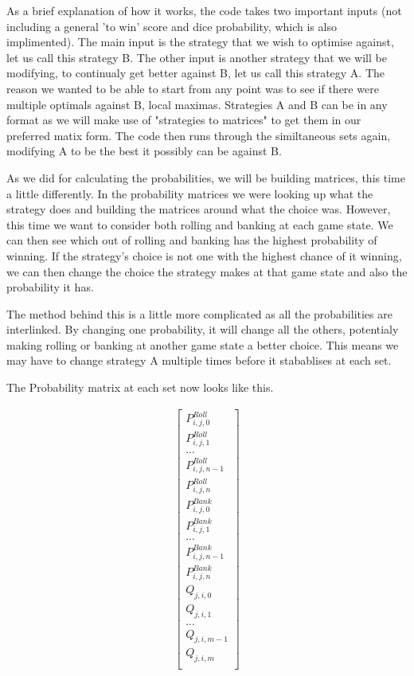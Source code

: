 \documentclass[a4paper,titlepage]{article}
\begin{document}
As a brief explanation of how it works, the code takes two important inputs (not including a general 'to win' score and dice probability, which is also implimented). The main input is the strategy that we wish to optimise against, let us call this strategy B. The other input is another strategy that we will be modifying, to continualy get better against B, let us call this strategy A. The reason we wanted to be able to start from any point was to see if there were multiple optimals against B, local maximas. Strategies A and B can be in any format as we will make use of "strategies to matrices" to get them in our preferred matix form. The code then runs through the similtaneous sets again, modifying A to be the best it possibly can be against B.

As we did for calculating the probabilities, we will be building matrices, this time a little differently. In the probability matrices we were looking up what the strategy does and building the matrices around what the choice was. However, this time we want to consider both rolling and banking at each game state. We can then see which out of rolling and banking has the highest probability of winning. If the strategy's choice is not one with the highest chance of it winning, we can then change the choice the strategy makes at that game state and also the probability it has.

The method behind this is a little more complicated as all the probabilities are interlinked. By changing one probability, it will change all the others, potentialy making rolling or banking at another game state a better choice. This means we may have to change strategy A multiple times before it stabablises at each set.

The Probability matrix at each set now looks like this.

\begin{align}
	\begin{bmatrix}
		P^{Roll}_{i,j,0}\\
		P^{Roll}_{i,j,1}\\
		...\\
		P^{Roll}_{i,j,n-1}\\
		P^{Roll}_{i,j,n}\\
		P^{Bank}_{i,j,0}\\
		P^{Bank}_{i,j,1}\\
		...\\
		P^{Bank}_{i,j,n-1}\\
		P^{Bank}_{i,j,n}\\
		Q_{j,i,0}\\
		Q_{j,i,1}\\
		...\\
		Q_{j,i,m-1}\\
		Q_{j,i,m}\\
	\end{bmatrix}
\end{align}
\end{document}
